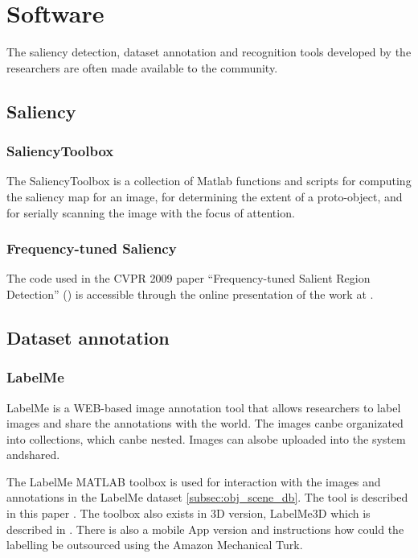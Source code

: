 \section{Software}
\label{sec:soft}

The saliency detection, dataset annotation and recognition tools developed by the researchers are often made available to the community.

\subsection{Saliency}
\subsubsection{SaliencyToolbox}\label{subsec:saltool}
The SaliencyToolbox is a collection of Matlab functions and scripts for computing the saliency map for an image, for determining the extent of a proto-object, and for serially scanning the image with the focus of attention. 

\subsubsection{Frequency-tuned Saliency}
The code used in the CVPR 2009 paper ``Frequency-tuned Salient Region Detection'' (\cite{LCAV-CONF-2009-012}) is accessible through the online presentation of the work at \cite{achantaCVPR09}.

\subsection{Dataset annotation}
\subsubsection{LabelMe}\label{subsec:labelme}
LabelMe is a WEB-based image annotation tool that allows researchers to label images and share the annotations with the world. The images canbe organizated into collections, which canbe nested. Images can alsobe uploaded into the system andshared.

The LabelMe MATLAB toolbox is used for interaction with the images and annotations in the LabelMe dataset \ref{subsec:obj_scene_db}. The tool is described in this paper
\cite{Russell2008}. The toolbox also exists in 3D version, LabelMe3D which is described in \cite{Russell2009}. There is also a mobile App version and instructions how could the labelling be outsourced using the Amazon Mechanical Turk.